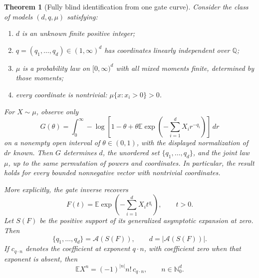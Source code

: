 \documentclass[11pt,letterpaper]{article}
\newtheorem{theorem}{Theorem}[section]
\theoremstyle{definition}
\theoremstyle{remark}
\newcommand{\E}{\mathbb E}
\newcommand{\1}{\mathbf 1}
\begin{document}
\begin{theorem}[Fully blind identification from one gate curve]
\label{p07:thm:blind-gate-identification}
Consider the class of models $(d,q,\mu)$ satisfying:
\begin{enumerate}[label=(\roman*)]
\item $d$ is an unknown finite positive integer;
\item $q=(q_1,\ldots,q_d)\in(1,\infty)^d$ has coordinates linearly
      independent over $\mathbb Q$;
\item $\mu$ is a probability law on $[0,\infty)^d$ with all mixed
      moments finite, determined by those moments;
\item every coordinate is nontrivial: $\mu\{x:x_i>0\}>0$.
\end{enumerate}
For $X\sim\mu$, observe only
\begin{equation}\label{p07:eq:blind-gate-data}
 G(\theta)=\int_0^\infty
   -\log\left[1-\theta+
      \theta\E\exp\left(-\sum_{i=1}^dX_i r^{-q_i}\right)\right]\,dr
\end{equation}
on a nonempty open interval of $\theta\in(0,1)$, with the displayed
normalization of $dr$ known. Then $G$ determines $d$, the unordered
set $\{q_1,\ldots,q_d\}$, and the joint law $\mu$, up to the same
permutation of powers and coordinates. In particular, the result holds
for every bounded nonnegative vector with nontrivial coordinates.

More explicitly, the gate inverse recovers
\begin{equation}\label{p07:eq:blind-curve}
 F(t)=\E\exp\left(-\sum_{i=1}^dX_i t^{q_i}\right),\qquad t>0.
\end{equation}
Let $S(F)$ be the positive support of its generalized asymptotic
expansion at zero. Then
\begin{equation}\label{p07:eq:blind-recovery}
 \{q_1,\ldots,q_d\}=\mathcal A(S(F)),\qquad
 d=|\mathcal A(S(F))|.
\end{equation}
If $c_{q\cdot n}$ denotes the coefficient at exponent $q\cdot n$,
with coefficient zero when that exponent is absent, then
\begin{equation}\label{p07:eq:blind-moment-recovery}
 \E X^n=(-1)^{|n|}n!\,c_{q\cdot n},\qquad n\in\mathbb N_0^d.
\end{equation}
\end{theorem}
\end{document}
